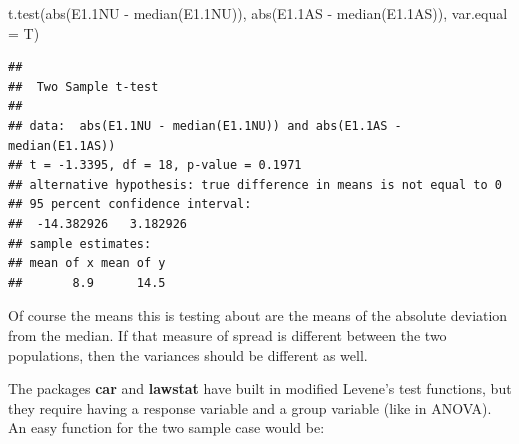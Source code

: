 \documentclass[
]{book}
\newenvironment{Shaded}{\begin{snugshade}}{\end{snugshade}}
\newcommand{\AttributeTok}[1]{\textcolor[rgb]{0.77,0.63,0.00}{#1}}
\newcommand{\ControlFlowTok}[1]{\textcolor[rgb]{0.13,0.29,0.53}{\textbf{#1}}}
\newcommand{\FloatTok}[1]{\textcolor[rgb]{0.00,0.00,0.81}{#1}}
\newcommand{\FunctionTok}[1]{\textcolor[rgb]{0.00,0.00,0.00}{#1}}
\newcommand{\NormalTok}[1]{#1}
\newcommand{\OtherTok}[1]{\textcolor[rgb]{0.56,0.35,0.01}{#1}}
\newcommand{\SpecialCharTok}[1]{\textcolor[rgb]{0.00,0.00,0.00}{#1}}
\newcommand{\StringTok}[1]{\textcolor[rgb]{0.31,0.60,0.02}{#1}}
\begin{document}
\begin{Shaded}
\begin{Highlighting}[]
\FunctionTok{t.test}\NormalTok{(}\FunctionTok{abs}\NormalTok{(E1}\FloatTok{.1}\NormalTok{NU }\SpecialCharTok{{-}} \FunctionTok{median}\NormalTok{(E1}\FloatTok{.1}\NormalTok{NU)), }\FunctionTok{abs}\NormalTok{(E1}\FloatTok{.1}\NormalTok{AS }\SpecialCharTok{{-}} \FunctionTok{median}\NormalTok{(E1}\FloatTok{.1}\NormalTok{AS)), }\AttributeTok{var.equal =}\NormalTok{ T)}
\end{Highlighting}
\end{Shaded}

\begin{verbatim}
## 
##  Two Sample t-test
## 
## data:  abs(E1.1NU - median(E1.1NU)) and abs(E1.1AS - median(E1.1AS))
## t = -1.3395, df = 18, p-value = 0.1971
## alternative hypothesis: true difference in means is not equal to 0
## 95 percent confidence interval:
##  -14.382926   3.182926
## sample estimates:
## mean of x mean of y 
##       8.9      14.5
\end{verbatim}

Of course the means this is testing about are the means of the absolute deviation from the median. If that measure of spread is different between the two populations, then the variances should be different as well.

The packages \textbf{car} and \textbf{lawstat} have built in modified Levene's test functions, but they require having a response variable and a group variable (like in ANOVA). An easy function for the two sample case would be:

\begin{Shaded}
\end{Shaded}
\end{document}
